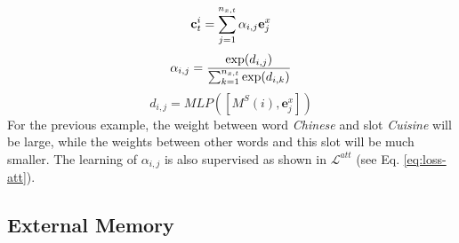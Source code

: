 \begin{equation}
    \mathbf{c}_t^i=\sum_{j=1}^{n_{x,t}}\alpha_{i,j}\mathbf{e}^x_j \\
\end{equation}
\begin{equation}\label{eq:attnweight}
    \alpha_{i,j}=\frac{\exp({d}_{i,j})}{\sum_{k=1}^{n_{x,t}}\exp({d}_{i,k})} \\
\end{equation}
\begin{equation}
    {d}_{i,j}=MLP([M^S(i), \mathbf{e}^x_j])
\end{equation}
For the previous example, the weight between word {\em Chinese} and slot {\em Cuisine} will be large, while the weights between other words and this slot will be much smaller. The learning of $\alpha_{i,j}$ is also supervised as shown in $\mathcal{L}^{att}$ (see Eq. \ref{eq:loss-att}). 


\subsection{External Memory}

